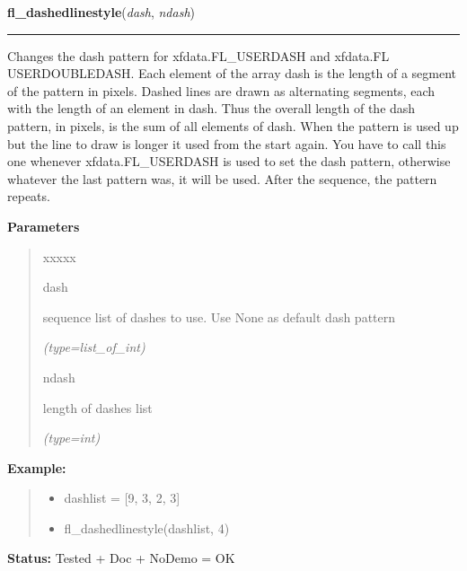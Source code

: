 \hspace{.8\funcindent}\begin{boxedminipage}{\funcwidth}

    \raggedright \textbf{fl\_dashedlinestyle}(\textit{dash}, \textit{ndash})

    \vspace{-1.5ex}

    \rule{\textwidth}{0.5\fboxrule}
\setlength{\parskip}{2ex}
    Changes the dash pattern for xfdata.FL\_USERDASH and xfdata.FL 
    USERDOUBLEDASH. Each element of the array dash is the length of a 
    segment of the pattern in pixels. Dashed lines are drawn as alternating
    segments, each with the length of an element in dash. Thus the overall 
    length of the dash pattern, in pixels, is the sum of all elements of 
    dash. When the pattern is used up but the line to draw is longer it 
    used from the start again. You have to call this one whenever 
    xfdata.FL\_USERDASH is used to set the dash pattern, otherwise whatever
    the last pattern was, it will be used. After the sequence, the pattern 
    repeats.

\setlength{\parskip}{1ex}
      \textbf{Parameters}
      \vspace{-1ex}

      \begin{quote}
        \begin{Ventry}{xxxxx}

          \item[dash]

          sequence list of dashes to use. Use None as default dash pattern

            {\it (type=list\_of\_int)}

          \item[ndash]

          length of dashes list

            {\it (type=int)}

        \end{Ventry}

      \end{quote}

\textbf{Example:}
\begin{quote}
  \begin{itemize}

  \item
    \setlength{\parskip}{0.6ex}
dashlist = [9, 3, 2, 3]



  \item fl\_dashedlinestyle(dashlist, 4)



\end{itemize}

\end{quote}

\textbf{Status:} Tested + Doc + NoDemo = OK



    \end{boxedminipage}

